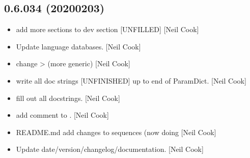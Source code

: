 \documentclass[a4paper,10pt,english]{report}
\begin{document}
\subsection{0.6.034 (2020\sphinxhyphen{}02\sphinxhyphen{}03)}
\label{\detokenize{misc/changelog:id3}}\begin{itemize}
\item {} 
 \sphinxhyphen{} add more sections to
dev section {[}UNFILLED{]} {[}Neil Cook{]}

\item {} 
Update language databases. {[}Neil Cook{]}

\item {} 
 \sphinxhyphen{} change  \textendash{}\textgreater{} 
(more generic) {[}Neil Cook{]}

\item {} 
 \sphinxhyphen{} write all doc strings {[}UNFINISHED{]}
up to end of ParamDict. {[}Neil Cook{]}

\item {} 
 \sphinxhyphen{} fill out all doc\sphinxhyphen{}strings. {[}Neil
Cook{]}

\item {} 
 \sphinxhyphen{} add comment to . {[}Neil Cook{]}

\item {} 
README.md \sphinxhyphen{} add changes to sequences (now doing  {[}Neil
Cook{]}

\item {} 
Update date/version/changelog/documentation. {[}Neil Cook{]}

\end{itemize}
\end{document}
